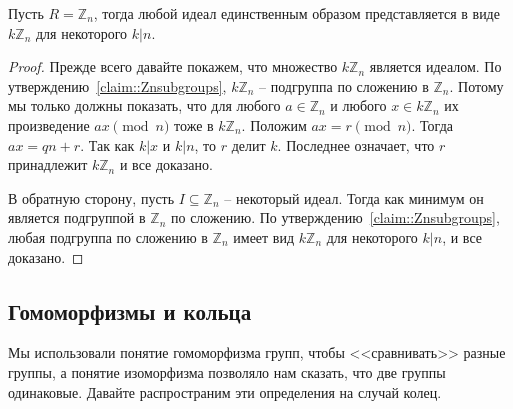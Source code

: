 \begin{claim}
\label{claim::ZnIdeals}
Пусть $R = \mathbb Z_n$, тогда любой идеал единственным образом представляется в виде $k\mathbb Z_n$ для некоторого $k|n$.
\end{claim}
\begin{proof}
Прежде всего давайте покажем, что множество $k \mathbb Z_n$ является идеалом.
По утверждению~\ref{claim::Znsubgroups}, $k \mathbb Z_n$ -- подгруппа по сложению в $\mathbb Z_n$.
Потому мы только должны показать, что для любого $a\in \mathbb Z_n$ и любого $x\in k \mathbb Z_n$ их произведение $a x \pmod n$ тоже в $k \mathbb Z_n$.
Положим $a x = r \pmod n$.
Тогда $a x = q n + r$.
Так как $k|x$ и $k | n$, то $r$ делит $k$.
Последнее означает, что $r$ принадлежит $k \mathbb Z_n$ и все доказано.

В обратную сторону, пусть $I\subseteq \mathbb Z_n$ -- некоторый идеал.
Тогда как минимум он является подгруппой в $\mathbb Z_n$ по сложению.
По утверждению~\ref{claim::Znsubgroups}, любая подгруппа по сложению в $\mathbb Z_n$ имеет вид $k \mathbb Z_n$ для некоторого $k | n$, и все доказано.
\end{proof}

\subsection{Гомоморфизмы и кольца}

Мы использовали понятие гомоморфизма групп, чтобы <<сравнивать>> разные группы, а понятие изоморфизма позволяло нам сказать, что две группы одинаковые.
Давайте распространим эти определения на случай колец.

